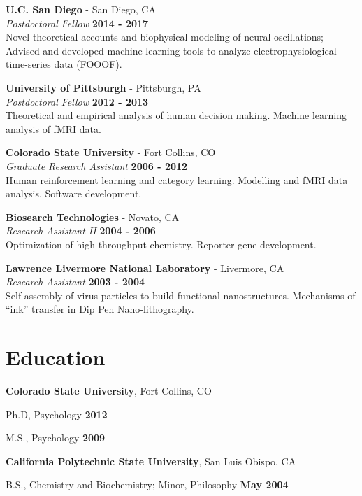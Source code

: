 \documentclass[margin,line]{res}
\newenvironment{list1}{
  \begin{list}{\ding{113}}{%
      \setlength{\itemsep}{0in}
      \setlength{\parsep}{0in} \setlength{\parskip}{0in}
      \setlength{\topsep}{0in} \setlength{\partopsep}{0in}
      \setlength{\leftmargin}{0.17in}}}{\end{list}}
\begin{document}
\begin{resume}
{\bf U.C. San Diego} - San Diego, CA\\
{\em Postdoctoral Fellow} \hfill {\bf 2014 - 2017}\\
Novel theoretical accounts and biophysical modeling of neural oscillations; Advised and developed machine-learning tools to analyze electrophysiological time-series data (FOOOF).

{\bf University of Pittsburgh} - Pittsburgh, PA\\
{\em Postdoctoral Fellow} \hfill {\bf 2012 - 2013}\\
Theoretical and empirical analysis of human decision making. Machine learning analysis of fMRI data.

{\bf Colorado State University} - Fort Collins, CO\\
{\em Graduate Research Assistant} \hfill {\bf 2006 - 2012}\\
Human reinforcement learning and category learning. Modelling and fMRI data analysis. Software development.

{\bf Biosearch Technologies} - Novato, CA\\
{\em Research Assistant II} \hfill {\bf 2004 - 2006}\\
Optimization of high-throughput chemistry. Reporter gene development.

{\bf Lawrence Livermore National Laboratory} - Livermore, CA\\
{\em Research Assistant} \hfill {\bf 2003 - 2004}\\
Self-assembly of virus particles to build functional nanostructures. Mechanisms of ``ink'' transfer in Dip Pen Nano-lithography.

\section{\sc Education}
{\bf Colorado State University}, Fort Collins, CO\\
\vspace*{-.1in}
\begin{list1}
\item[] Ph.D, Psychology \hfill {\bf 2012}
\item[] M.S., Psychology \hfill {\bf 2009}
\end{list1}

{\bf California Polytechnic State University}, San Luis Obispo, CA\\
\vspace*{-.1in}
\begin{list1}
\item[] B.S., Chemistry and Biochemistry; Minor, Philosophy \hfill {\bf May 2004}
\end{list1}


\end{resume}
\end{document}
